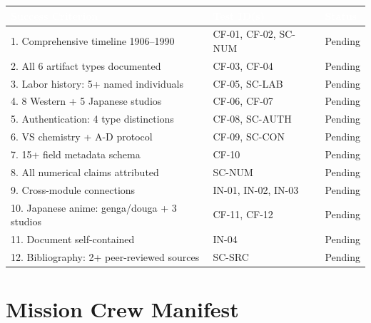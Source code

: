 \documentclass[11pt,letterpaper]{article}
\newcommand{\tableheader}[1]{\textbf{\sffamily\textcolor{white}{#1}}}
\begin{document}
\begin{center}
\begin{tabularx}{\textwidth}{XL{3.5cm}C{1.5cm}}
\toprule
{}
\tableheader{Success Criterion} & \tableheader{Test ID(s)} & \tableheader{Status} \\
. Comprehensive timeline 1906--1990 & CF-01, CF-02, SC-NUM & Pending \\
2. All 6 artifact types documented & CF-03, CF-04 & Pending \\
3. Labor history: 5+ named individuals & CF-05, SC-LAB & Pending \\
4. 8 Western + 5 Japanese studios & CF-06, CF-07 & Pending \\
5. Authentication: 4 type distinctions & CF-08, SC-AUTH & Pending \\
6. VS chemistry + A-D protocol & CF-09, SC-CON & Pending \\
7. 15+ field metadata schema & CF-10 & Pending \\
8. All numerical claims attributed & SC-NUM & Pending \\
9. Cross-module connections & IN-01, IN-02, IN-03 & Pending \\
10. Japanese anime: genga/douga + 3 studios & CF-11, CF-12 & Pending \\
11. Document self-contained & IN-04 & Pending \\
12. Bibliography: 2+ peer-reviewed sources & SC-SRC & Pending \\
\bottomrule
\end{tabularx}
\end{center}

\section{Mission Crew Manifest}
\end{document}
